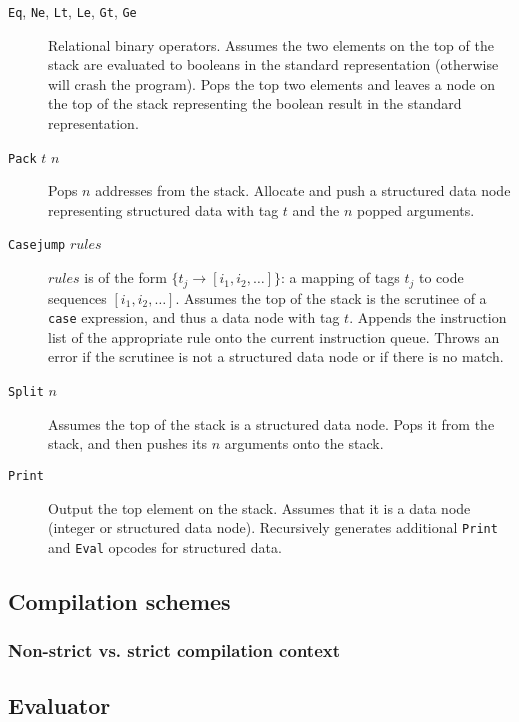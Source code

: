 \begin{description}
\item[\texttt{Eq}, \texttt{Ne}, \texttt{Lt}, \texttt{Le}, \texttt{Gt}, \texttt{Ge}] Relational binary operators. Assumes the two elements on the top of the stack are evaluated to booleans in the standard representation (otherwise will crash the program). Pops the top two elements and leaves a node on the top of the stack representing the boolean result in the standard representation.
\item[\texttt{Pack} $t$ $n$] Pops $n$ addresses from the stack. Allocate and push a structured data node representing structured data with tag $t$ and the $n$ popped arguments.
\item[\texttt{Casejump} $rules$] $rules$ is of the form $\{t_j\to [i_1,i_2,\dots]\}$: a mapping of tags $t_j$ to code sequences $[i_1,i_2,\dots]$. Assumes the top of the stack is the scrutinee of a \texttt{case} expression, and thus a data node with tag $t$. Appends the instruction list of the appropriate rule onto the current instruction queue. Throws an error if the scrutinee is not a structured data node or if there is no match.
\item[\texttt{Split} $n$] Assumes the top of the stack is a structured data node. Pops it from the stack, and then pushes its $n$ arguments onto the stack.
\item[\texttt{Print}] Output the top element on the stack. Assumes that it is a data node (integer or structured data node). Recursively generates additional \texttt{Print} and \texttt{Eval} opcodes for structured data.

\end{description}

\subsection{Compilation schemes}
\label{sec:compilation-schemes}


\subsubsection{Non-strict vs. strict compilation context}
\label{sec:strict-context}


\subsection{Evaluator}
\label{sec:evaluator}

